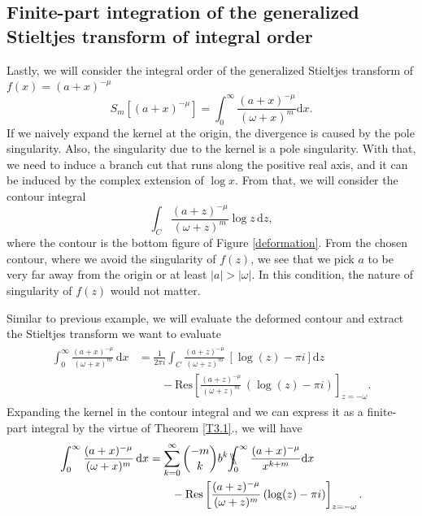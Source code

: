 \subsection{Finite-part integration of the generalized Stieltjes transform of integral order}
Lastly, we will consider the integral order of the generalized Stieltjes transform of $f(x) = (a+x)^{-\mu}$
\begin{equation}
    S_{m}[(a+x)^{-\mu}] = \int_{0}^{\infty} \frac{(a+x)^{-\mu}}{(\omega+x)^{m}} \mathrm{d}x.
\end{equation}
If we naively expand the kernel at the origin, the divergence is caused by the pole singularity. Also, the singularity due to the kernel is a pole singularity. With that, we need to induce a branch cut that runs along the positive real axis, and it can be induced by the complex extension of $\log x$. From that, we will consider the contour integral 
\begin{equation}
    \int_C \frac{(a+z)^{-\mu}}{(\omega +z )^{m}} \log{z} \, \mathrm{d}z,
\end{equation}
where the contour is the bottom figure of Figure \ref{deformation}. From the chosen contour, where we avoid the singularity of $f(z)$, we see that we pick $a$ to be very far away from the origin or at least $|a| > |\omega|$. In this condition, the nature of singularity of $f(z)$ would not matter. 

Similar to previous example, we will evaluate the deformed contour and extract the Stieltjes transform we want to evaluate
\begin{align}
\begin{split}
    \int_0^\infty \frac{(a+x)^{-\mu}}{(\omega+x)^m} \, \mathrm{d}x & = \frac{1}{2 \pi i} \int_C \frac{(a+z)^{-\mu}}{(\omega + z)^{m}} \, \left[ \log(z) -\pi i \right]\mathrm{d}z \\& \qquad - \mathrm{Res} \left[ \frac{ (a+z)^{-\mu}}{(\omega+z)^{m}}\, (\log(z) - \pi i)\right]_{z=-\omega}.
\end{split}
\end{align}
Expanding the kernel in the contour integral and we can express it as a finite-part integral by the virtue of Theorem \ref{T3.1}., we will have
\begin{align}
\begin{split}
    \int_0^\infty \frac{(a+x)^{-\mu}}{(\omega+x)^m} \, \mathrm{d}x & = \sum_{k=0}^{\infty} {-m \choose k} b^{k}   \bbint{0}{\infty} \frac{(a+x)^{-\mu}}{x^{k+m}} \mathrm{d}x \\& \qquad - \mathrm{Res} \left[ \frac{ (a+z)^{-\mu}}{(\omega+z)^{m}}\, (\log(z) - \pi i)\right]_{z=-\omega}.
\end{split}
\end{align}



